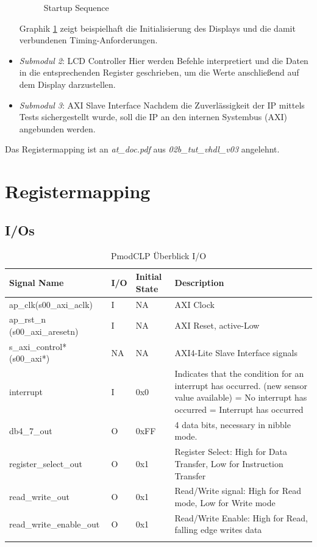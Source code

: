 \begin{itemize}
\begin{figure}[h!]
\begin{minipage}{0.15\textwidth}
        \end{minipage}
        \caption{Startup Sequence}
        \label{fig:startup_sequence}
    \end{figure}
    \newline
    Graphik \ref{fig:startup_sequence} zeigt beispielhaft die Initialisierung des Displays und die damit verbundenen Timing-Anforderungen.
    \item \textit{Submodul 2}: LCD Controller  \newline
    Hier werden Befehle interpretiert und die Daten in die entsprechenden Register geschrieben, um die Werte anschließend auf dem Display darzustellen.
    \item \textit{Submodul 3}: AXI Slave Interface  \newline
    Nachdem die Zuverlässigkeit der IP mittels Tests sichergestellt wurde, soll die IP an den internen Systembus (AXI) angebunden werden.
\end{itemize}

Das Registermapping ist an \textit{at\_doc.pdf} aus \textit{02b\_tut\_vhdl\_v03} angelehnt.

\section{Registermapping}

\subsection{I/Os}
\begin{longtable}{|p{4cm}|p{1cm}|p{2cm}|p{6.6cm}|}
\hline
\textbf{Signal Name} & \textbf{I/O} & \textbf{Initial State} & \textbf{Description} \\
\hline
ap\_clk(s00\_axi\_aclk) & I & NA & AXI Clock \\
\hline
ap\_rst\_n (s00\_axi\_aresetn) & I & NA & AXI Reset, active-Low \\
\hline
s\_axi\_control* (s00\_axi*) & NA & NA & AXI4-Lite Slave Interface signals \\
\hline
interrupt & I & 0x0 & Indicates that the condition for an interrupt has occurred. (new sensor value available)
\newline 0 = No interrupt has occurred
\newline 1 = Interrupt has occurred \\
\hline
db4\_7\_out & O & 0xFF & 4 data bits, necessary in nibble mode. \\
\hline
register\_select\_out & O & 0x1 & Register Select: High for Data Transfer, Low for Instruction Transfer \\
\hline
read\_write\_out & O & 0x1 & Read/Write signal: High for Read mode, Low for Write mode \\
\hline
read\_write\_enable\_out & O & 0x1 & Read/Write Enable: High for Read, falling edge writes data \\
\hline
\caption{PmodCLP Überblick I/O}
\end{longtable}

